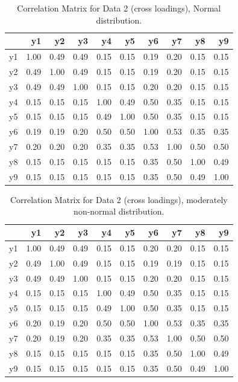 \documentclass[
  letterpaper,
  DIV=11,
  numbers=noendperiod]{scrartcl}
\begin{document}
\begin{longtable}[]{@{}lrrrrrrrrr@{}}

\caption{\label{tbl-cors_data_4}Correlation Matrix for Data 2 (cross
loadings), Normal distribution.}

\tabularnewline

\toprule\noalign{}
& y1 & y2 & y3 & y4 & y5 & y6 & y7 & y8 & y9 \\
\midrule\noalign{}
\endhead
\bottomrule\noalign{}
\endlastfoot
y1 & 1.00 & 0.49 & 0.49 & 0.15 & 0.15 & 0.19 & 0.20 & 0.15 & 0.15 \\
y2 & 0.49 & 1.00 & 0.49 & 0.15 & 0.15 & 0.19 & 0.20 & 0.15 & 0.15 \\
y3 & 0.49 & 0.49 & 1.00 & 0.15 & 0.15 & 0.20 & 0.20 & 0.15 & 0.15 \\
y4 & 0.15 & 0.15 & 0.15 & 1.00 & 0.49 & 0.50 & 0.35 & 0.15 & 0.15 \\
y5 & 0.15 & 0.15 & 0.15 & 0.49 & 1.00 & 0.50 & 0.35 & 0.15 & 0.15 \\
y6 & 0.19 & 0.19 & 0.20 & 0.50 & 0.50 & 1.00 & 0.53 & 0.35 & 0.35 \\
y7 & 0.20 & 0.20 & 0.20 & 0.35 & 0.35 & 0.53 & 1.00 & 0.50 & 0.50 \\
y8 & 0.15 & 0.15 & 0.15 & 0.15 & 0.15 & 0.35 & 0.50 & 1.00 & 0.49 \\
y9 & 0.15 & 0.15 & 0.15 & 0.15 & 0.15 & 0.35 & 0.50 & 0.49 & 1.00 \\

\end{longtable}

\begin{longtable}[]{@{}lrrrrrrrrr@{}}

\caption{\label{tbl-cors_data_5}Correlation Matrix for Data 2 (cross
loadings), moderately non-normal distribution.}

\tabularnewline

\toprule\noalign{}
& y1 & y2 & y3 & y4 & y5 & y6 & y7 & y8 & y9 \\
\midrule\noalign{}
\endhead
\bottomrule\noalign{}
\endlastfoot
y1 & 1.00 & 0.49 & 0.49 & 0.15 & 0.15 & 0.20 & 0.20 & 0.15 & 0.15 \\
y2 & 0.49 & 1.00 & 0.49 & 0.15 & 0.15 & 0.19 & 0.19 & 0.15 & 0.15 \\
y3 & 0.49 & 0.49 & 1.00 & 0.15 & 0.15 & 0.20 & 0.20 & 0.15 & 0.15 \\
y4 & 0.15 & 0.15 & 0.15 & 1.00 & 0.49 & 0.50 & 0.35 & 0.15 & 0.15 \\
y5 & 0.15 & 0.15 & 0.15 & 0.49 & 1.00 & 0.50 & 0.35 & 0.15 & 0.15 \\
y6 & 0.20 & 0.19 & 0.20 & 0.50 & 0.50 & 1.00 & 0.53 & 0.35 & 0.35 \\
y7 & 0.20 & 0.19 & 0.20 & 0.35 & 0.35 & 0.53 & 1.00 & 0.50 & 0.50 \\
y8 & 0.15 & 0.15 & 0.15 & 0.15 & 0.15 & 0.35 & 0.50 & 1.00 & 0.49 \\
y9 & 0.15 & 0.15 & 0.15 & 0.15 & 0.15 & 0.35 & 0.50 & 0.49 & 1.00 \\

\end{longtable}
\end{document}

